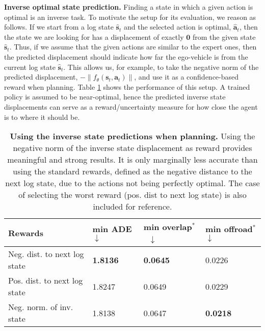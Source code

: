 \textbf{Inverse optimal state prediction.} Finding a state in which a given action is optimal is an inverse task. To motivate the setup for its evaluation, we reason as follows. If we start from a log state $\hat{\mathbf{s}}_t$ and the selected action is optimal, $\hat{\mathbf{a}}_t$, then the state we are looking for has a displacement of exactly $\mathbf{0}$ from the given state $\hat{\mathbf{s}}_t$. Thus, if we assume that the given actions are similar to the expert ones, then the predicted displacement should indicate how far the ego-vehicle is from the current log state $\hat{\mathbf{s}}_t$. This allows us, for example, to take the negative norm of the predicted displacement, $-\lVert f_\theta(\mathbf{s}_t, \mathbf{a}_t) \rVert$, and use it as a confidence-based reward when planning. Table \ref{table: inverse_opt_state_as_rewards} shows the performance of this setup. A trained policy is assumed to be near-optimal, hence the predicted inverse state displacements can serve as a reward/uncertainty measure for how close the agent is to where it should be.

\begin{table}[h]
    \small
    \centering
    \begin{tabular}[width=\textwidth]{ p{} | p{} p{} p{} } \toprule[1.5pt]
         \textbf{Rewards}  & min ADE $\downarrow$ & min \mbox{overlap$^\ast$ $\downarrow$} &  min offroad$^\ast$ $\downarrow$  \\
         \midrule[1pt]
         Neg. dist. to next log state  & \textbf{1.8136} &  \textbf{0.0645} & 0.0226 \\
         Pos. dist. to next log state  & 1.8247 &  0.0649 & 0.0229 \\
         Neg. norm. of inv. state & 1.8138 &  0.0647 & \textbf{0.0218} \\
         \bottomrule[1.5pt]
    \end{tabular}
    \captionsetup{aboveskip=0.3cm, belowskip=-0.3cm}
    \caption{\textbf{Using the inverse state predictions when planning.} Using the negative norm of the inverse state displacement as reward provides meaningful and strong results. It is only marginally less accurate than using the standard rewards, defined as the negative distance to the next log state, due to the actions not being perfectly optimal. The case of selecting the worst reward (pos. dist to next log state) is also included for reference.}
    \label{table: inverse_opt_state_as_rewards}
\end{table}

